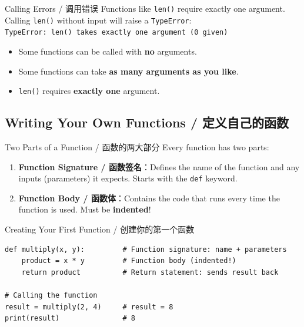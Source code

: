 \documentclass[11pt,a4paper]{report}
\let\oldtexttt\texttt
\renewcommand{\texttt}[1]{\textcolor{mainblue}{\oldtexttt{#1}}}
\begin{document}
\begin{warning}{Calling Errors / 调用错误}
    Functions like \texttt{len()} require exactly one argument. Calling \texttt{len()} without input will raise a \texttt{TypeError}:\\
    \texttt{TypeError: len() takes exactly one argument (0 given)}

    \begin{itemize}[itemsep=0.3em]
        \item Some functions can be called with \textbf{no} arguments.
        \item Some functions can take \textbf{as many arguments as you like}.
        \item \texttt{len()} requires \textbf{exactly one} argument.
    \end{itemize}
\end{warning}

\subsection{Writing Your Own Functions / 定义自己的函数}

\begin{concept}{Two Parts of a Function / 函数的两大部分}
    Every function has two parts:
    \begin{enumerate}
        \item \textbf{Function Signature / 函数签名}：Defines the name of the function and any inputs (parameters) it expects. Starts with the \texttt{def} keyword.
        \item \textbf{Function Body / 函数体}：Contains the code that runs every time the function is used. Must be \textbf{indented}!
    \end{enumerate}
\end{concept}

\begin{examplebox}{Creating Your First Function / 创建你的第一个函数}
\begin{lstlisting}
def multiply(x, y):         # Function signature: name + parameters
    product = x * y         # Function body (indented!)
    return product          # Return statement: sends result back

# Calling the function
result = multiply(2, 4)     # result = 8
print(result)               # 8
\end{lstlisting}
\end{examplebox}
\end{document}
